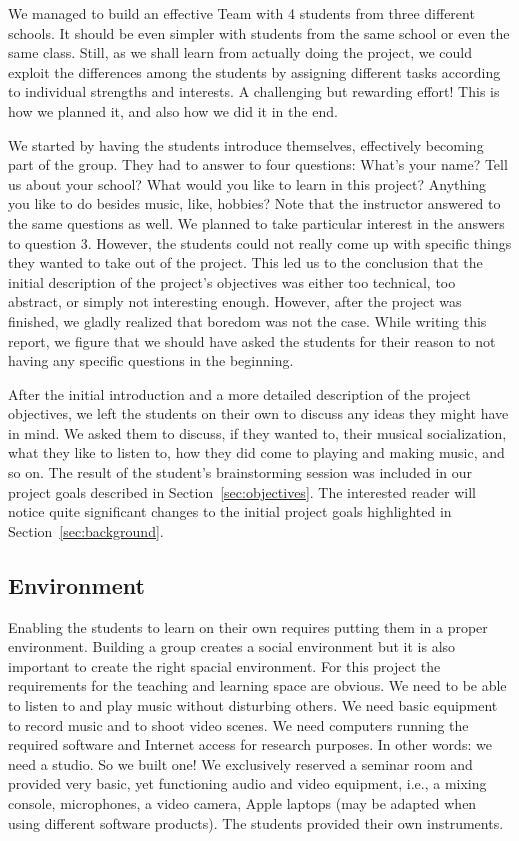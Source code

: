 \documentclass[onecolumn,nocopyrightspace,preprint]{sigplanconf}
\begin{document}
We managed to build an effective Team with 4 students from three different
schools.  It should be even simpler with students from the same school or even
the same class. Still, as we shall learn from actually doing the project, we
could exploit the differences among the students by assigning different tasks
according to individual strengths and interests. A challenging but rewarding
effort! This is how we planned it, and also how we did it in the end. 

We started by having the students introduce themselves, effectively becoming
part of the group. They had to answer to four questions: What's your name?
Tell us about your school?  What would you like to learn in this project?
Anything you like to do besides music, like, hobbies? Note that the instructor
answered to the same questions as well.  We planned to take particular
interest in the answers to question 3. However, the students could not really
come up with specific things they wanted to take out of the project. This led
us to the conclusion that the initial description of the project's objectives
was either too technical, too abstract, or simply not interesting enough.
However, after the project was finished, we gladly realized that boredom was
not the case. While writing this report, we figure that we should have asked
the students for their reason to not having any specific questions in the
beginning.

After the initial introduction and a more detailed description of the project
objectives, we left the students on their own to discuss any ideas they might
have in mind. We asked them to discuss, if they wanted to, their musical
socialization, what they like to listen to, how they did come to playing and
making music, and so on. The result of the student's brainstorming session
was included in our project goals described in Section~\ref{sec:objectives}.
The interested reader will notice quite significant changes to the initial
project goals highlighted in Section~\ref{sec:background}.


\subsection{Environment}

Enabling the students to learn on their own requires putting them in a proper
environment. Building a group creates a social environment but it is also
important to create the right spacial environment. For this project the
requirements for the teaching and learning space are obvious. We need to be
able to listen to and play music without disturbing others. We need basic
equipment to record music and to shoot video scenes. We need computers running
the required software and  Internet access for research purposes. In other
words: we need a studio. So we built one! We exclusively reserved a seminar
room and provided very basic, yet functioning audio and video equipment, i.e.,
a mixing console, microphones, a video camera, Apple laptops (may be adapted
when using different software products). The students provided their own
instruments.
\end{document}
